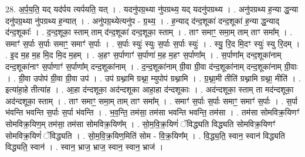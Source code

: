 \documentclass[17pt]{extarticle}
\begin{document}
28. अ॒र्प॒य॒ति॒ यद् यद॑र्पय त्यर्पयति॒ यत् । . यदनु॑पग्र॒थ्या नु॑पग्रथ्य॒ यद् यदनु॑पग्रथ्य । . अनु॑पग्रथ्य ह॒न्या द्ध॒न्या दनु॑पग्र॒थ्या नु॑पग्रथ्य ह॒न्यात् । . अनु॑पग्र॒थ्येत्यनु॑प - ग्र॒थ्य॒ । . ह॒न्याद् द॑न्द॒शूका॑ दन्द॒शूका॑ ह॒न्या द्ध॒न्याद् द॑न्द॒शूकाः᳚ । . द॒न्द॒शूका॒ स्ताम् ताम् द॑न्द॒शूका॑ दन्द॒शूका॒ स्ताम् । . ताꣳ समाꣳ॒॒ समा॒म् ताम् ताꣳ समा᳚म् । . समाꣳ॑ स॒र्पाः स॒र्पाः समाꣳ॒॒ समाꣳ॑ स॒र्पाः । . स॒र्पाः स्युः॑ स्युः स॒र्पाः स॒र्पाः स्युः॑ । . स्यु॒ रि॒द मि॒दꣳ स्युः॑ स्यु रि॒दम् । . इ॒द म॒ह म॒ह मि॒द मि॒द म॒हम् । . अ॒हꣳ स॒र्पाणाꣳ॑ स॒र्पाणा॑ म॒ह म॒हꣳ स॒र्पाणा᳚म् । . स॒र्पाणा᳚म् दन्द॒शूका॑नाम् दन्द॒शूका॑नाꣳ स॒र्पाणाꣳ॑ स॒र्पाणा᳚म् दन्द॒शूका॑नाम् । . द॒न्द॒शूका॑नाम् ग्री॒वा ग्री॒वा द॑न्द॒शूका॑नाम् दन्द॒शूका॑नाम् ग्री॒वाः । . ग्री॒वा उपोप॑ ग्री॒वा ग्री॒वा उप॑ । . उप॑ ग्रथ्नामि ग्रथ्ना॒ म्युपोप॑ ग्रथ्नामि । . ग्र॒थ्ना॒मी तीति॑ ग्रथ्नामि ग्रथ्ना॒ मीति॑ । . इत्या॑हा॒हे तीत्या॑ह । . आ॒हा द॑न्दशूका॒ अद॑न्दशूका आहा॒हा द॑न्दशूकाः । . अद॑न्दशूका॒ स्ताम् ता मद॑न्दशूका॒ अद॑न्दशूका॒ स्ताम् । . ताꣳ समाꣳ॒॒ समा॒म् ताम् ताꣳ समा᳚म् । . समाꣳ॑ स॒र्पाः स॒र्पाः समाꣳ॒॒ समाꣳ॑ स॒र्पाः । . स॒र्पा भ॑वन्ति भवन्ति स॒र्पाः स॒र्पा भ॑वन्ति । . भ॒व॒न्ति॒ तम॑सा॒ तम॑सा भवन्ति भवन्ति॒ तम॑सा । . तम॑सा सोमविक्र॒यिणꣳ॑ सोमविक्र॒यिण॒म् तम॑सा॒ तम॑सा सोमविक्र॒यिण᳚म् । . सो॒म॒वि॒क्र॒यिणं॑ ॅविद्ध्यति विद्ध्यति सोमविक्र॒यिणꣳ॑ सोमविक्र॒यिणं॑ ॅविद्ध्यति । . सो॒म॒वि॒क्र॒यिण॒मिति॑ सोम - वि॒क्र॒यिण᳚म् । . वि॒द्ध्य॒ति॒ स्वान॒ स्वान॑ विद्ध्यति विद्ध्यति॒ स्वान॑ । . स्वान॒ भ्राज॒ भ्राज॒ स्वान॒ स्वान॒ भ्राज॑ । \newline
\end{document}
